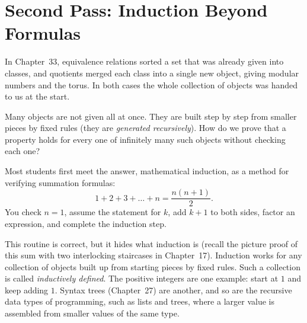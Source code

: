 \section{Second Pass: Induction Beyond Formulas}
\chapterline

In Chapter~33, equivalence relations sorted a set that was already given into classes, and quotients merged each class into a single new object, giving modular numbers and the torus. In both cases the whole collection of objects was handed to us at the start.

Many objects are not given all at once. They are built step by step from smaller pieces by fixed rules (they are \emph{generated recursively}). How do we prove that a property holds for every one of infinitely many such objects without checking each one?

Most students first meet the answer, mathematical induction, as a method for verifying summation formulas:
\[
1 + 2 + 3 + \dots + n = \frac{n(n+1)}{2}.
\]
You check $n=1$, assume the statement for $k$, add $k+1$ to both sides, factor an expression, and complete the induction step.

This routine is correct, but it hides what induction is (recall the picture proof of this sum with two interlocking staircases in Chapter~17). Induction works for any collection of objects built up from starting pieces by fixed rules. Such a collection is called \emph{inductively defined}. The positive integers are one example: start at $1$ and keep adding $1$. Syntax trees (Chapter~27) are another, and so are the recursive data types of programming, such as lists and trees, where a larger value is assembled from smaller values of the same type.

